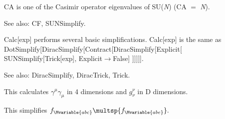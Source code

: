 



CA is one of the Casimir operator eigenvalues of SU({\itshape N}) (CA \(=\) {\itshape N}).

See also:  CF, SUNSimplify.










Calc[exp] performs several basic simplifications. Calc[exp] is the same as DotSimplify[DiracSimplify[Contract[DiracSimplify[Explicit[
  SUNSimplify[Trick[exp], Explicit\(\rightarrow \)False] ]]]]].

See also:  DiracSimplify, DiracTrick, Trick.


This calculates \({{\gamma }^{\mu }}{{\gamma }_{\mu }}\) in 4 dimensions and \(g_{\nu }^{\nu }\) in D dimensions.



This simplifies \({f_{\Mvariable{abc}}}\multsp {f_{\Mvariable{abe}}}.\)





